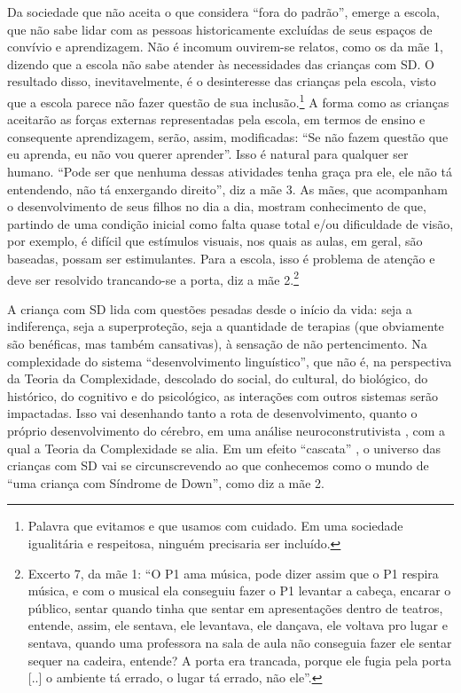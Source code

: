 \documentclass[output=paper,colorlinks,citecolor=brown,booklanguage=portuguese]{langscibook}
\begin{document}
Da sociedade que não aceita o que considera “fora do padrão”, emerge a escola, que não sabe lidar com as pessoas historicamente excluídas de seus espaços de convívio e aprendizagem. Não é incomum ouvirem-se relatos, como os da mãe 1, dizendo que a escola não sabe atender às necessidades das crianças com SD. O resultado disso, inevitavelmente, é o desinteresse das crianças pela escola, visto que a escola parece não fazer questão de sua inclusão.\footnote{Palavra que evitamos e que usamos com cuidado. Em uma sociedade igualitária e respeitosa, ninguém precisaria ser incluído.} A forma como as crianças aceitarão as forças externas representadas pela escola, em termos de ensino e consequente aprendizagem, serão, assim, modificadas: “Se não fazem questão que eu aprenda, eu não vou querer aprender”. Isso é natural para qualquer ser humano. “Pode ser que nenhuma dessas atividades tenha graça pra ele, ele não tá entendendo, não tá enxergando direito”, diz a mãe 3. As mães, que acompanham o desenvolvimento de seus filhos no dia a dia, mostram conhecimento de que, partindo de uma condição inicial como falta quase total e/ou dificuldade de visão, por exemplo, é difícil que estímulos visuais, nos quais as aulas, em geral, são baseadas, possam ser estimulantes. Para a escola, isso é problema de atenção e deve ser resolvido trancando-se a porta, diz a mãe 2.\footnote{Excerto 7, da mãe 1: “O P1 ama música, pode dizer assim que o P1 respira música, e com o musical ela conseguiu fazer o P1 levantar a cabeça, encarar o público, sentar quando tinha que sentar em apresentações dentro de teatros, entende, assim, ele sentava, ele levantava, ele dançava, ele voltava pro lugar e sentava, quando uma professora na sala de aula não conseguia fazer ele sentar sequer na cadeira, entende? A porta era trancada, porque ele fugia pela porta [..] o ambiente tá errado, o lugar tá errado, não ele”.}

A criança com SD lida com questões pesadas desde o início da vida: seja a indiferença, seja a superproteção, seja a quantidade de terapias (que obviamente são benéficas, mas também cansativas), à sensação de não pertencimento. Na complexidade do sistema “desenvolvimento linguístico”, que não é, na perspectiva da Teoria da Complexidade, descolado do social, do cultural, do biológico, do histórico, do cognitivo e do psicológico, as interações com outros sistemas serão impactadas. Isso vai desenhando tanto a rota de desenvolvimento, quanto o próprio desenvolvimento do cérebro, em uma análise neuroconstrutivista \citep{Mareschal2007a, Mareschal2007b}, com a qual a Teoria da Complexidade se alia. Em um efeito “cascata” \citep{KarmiloffSmith1998}, o universo das crianças com SD vai se circunscrevendo ao que conhecemos como o mundo de “uma criança com Síndrome de Down”, como diz a mãe 2.
\end{document}
